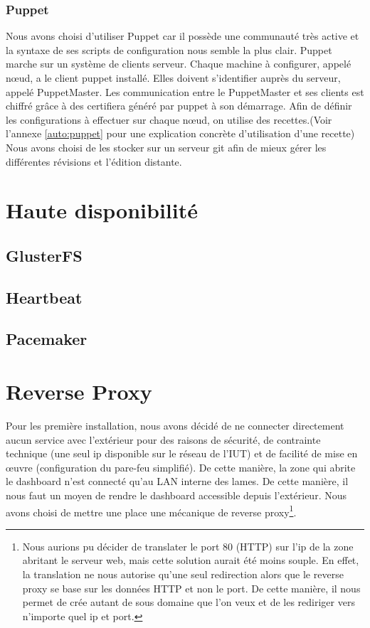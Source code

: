 \documentclass[a4paper,oneside]{report}
\begin{document}
\subsubsection{Puppet} 
Nous avons choisi d'utiliser Puppet car il possède une communauté très active et la syntaxe de ses scripts de configuration nous semble la plus clair.
Puppet marche sur un système de clients serveur.
Chaque machine à configurer, appelé nœud, a le client puppet installé.
Elles doivent s'identifier auprès du serveur, appelé PuppetMaster.
Les communication entre le PuppetMaster et ses clients est chiffré grâce à des certifiera généré par puppet à son démarrage.
Afin de définir les configurations à effectuer sur chaque nœud, on utilise des recettes.(Voir l'annexe \ref{auto:puppet} pour une explication concrète d'utilisation d'une recette)
Nous avons choisi de les stocker sur un serveur git afin de mieux gérer les différentes révisions et l'édition distante.

\section{Haute disponibilité}
\subsection{GlusterFS}

\subsection{Heartbeat}

\subsection{Pacemaker}

\section{Reverse Proxy}
Pour les première installation, nous avons décidé de ne connecter directement aucun service avec l'extérieur pour des raisons de sécurité, de contrainte technique (une seul ip disponible sur le réseau de l'IUT) et de facilité de mise en œuvre (configuration du pare-feu simplifié).
De cette manière, la zone qui abrite le dashboard n'est connecté qu'au LAN interne des lames.
De cette manière, il nous faut un moyen de rendre le dashboard accessible depuis l'extérieur. 
Nous avons choisi de mettre une place une mécanique de reverse proxy\footnote{Nous aurions pu décider de translater le port 80 (HTTP) sur l'ip de la zone abritant le serveur web, mais cette solution aurait été moins souple.
En effet, la translation ne nous autorise qu'une seul redirection alors que le reverse proxy se base sur les données HTTP et non le port. De cette manière, il nous permet de crée autant de sous domaine que l'on veux et de les rediriger vers n'importe quel ip et port.}.
\end{document}
